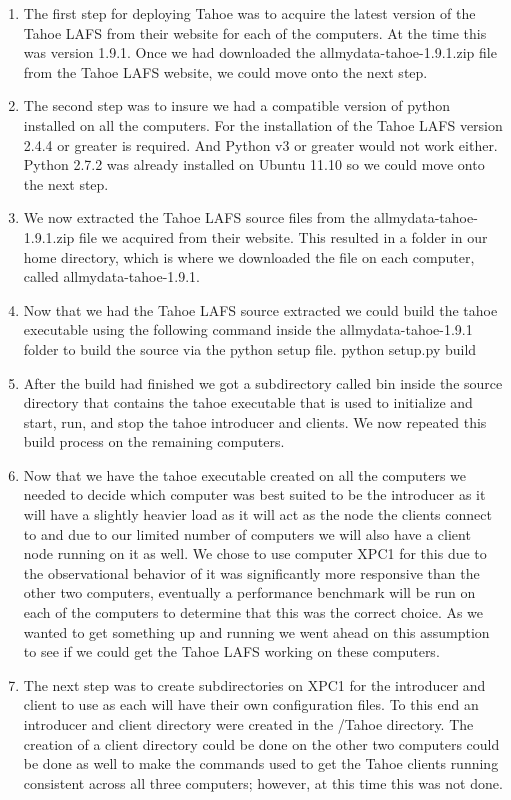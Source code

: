\documentclass[11pt]{article}
\begin{document}
\begin{enumerate}
\item The first step for deploying Tahoe was to acquire the latest version of the Tahoe LAFS from their website for each of the computers. \cite{tahoe-lafs.org} At the time this was version 1.9.1. Once we had downloaded the allmydata-tahoe-1.9.1.zip file from the Tahoe LAFS website, we could move onto the next step.
\item The second step was to insure we had a compatible version of python installed on all the computers. \cite{python.org} For the installation of the Tahoe LAFS version 2.4.4 or greater is required. And Python v3 or greater would not work either. Python 2.7.2 was already installed on Ubuntu 11.10 so we could move onto the next step.
\item We now extracted the Tahoe LAFS source files from the allmydata-tahoe-1.9.1.zip file we acquired from their website. This resulted in a folder in our home directory, which is where we downloaded the file on each computer, called allmydata-tahoe-1.9.1. 
\item Now that we had the Tahoe LAFS source extracted we could build the tahoe executable using the following command inside the allmydata-tahoe-1.9.1 folder to build the source via the python setup file.
\subitem python setup.py build
\item After the build had finished we got a subdirectory called bin inside the source directory that contains the tahoe executable that is used to initialize and start, run, and stop the tahoe introducer and clients. We now repeated this build process on the remaining computers.
\item Now that we have the tahoe executable created on all the computers we needed to decide which computer was best suited to be the introducer as it will have a slightly heavier load as it will act as the node the clients connect to and due to our limited number of computers we will also have a client node running on it as well. We chose to use computer XPC1 for this due to the observational behavior of it was significantly more responsive than the other two computers, eventually a performance benchmark will be run on each of the computers to determine that this was the correct choice. As we wanted to get something up and running we went ahead on this assumption to see if we could get the Tahoe LAFS working on these computers.
\item The next step was to create subdirectories on XPC1 for the introducer and client to use as each will have their own configuration files. To this end an introducer and client directory were created in the /Tahoe directory. The creation of a client directory could be done on the other two computers could be done as well to make the commands used to get the Tahoe clients running consistent across all three computers; however, at this time this was not done. 

\end{enumerate}
\end{document}
